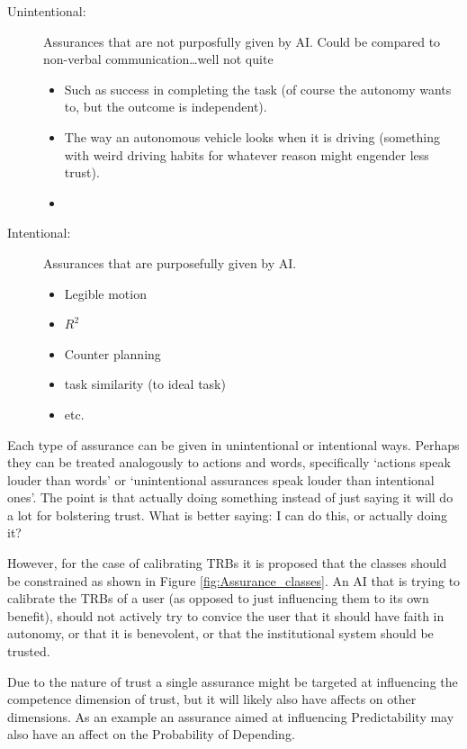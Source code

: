     \begin{description}
        \item [Unintentional:] Assurances that are not purposfully given by AI. Could be compared to non-verbal communication\ldots well not quite
        \begin{itemize}
            \item Such as success in completing the task (of course the autonomy wants to, but the outcome is independent).
            \item The way an autonomous vehicle looks when it is driving (something with weird driving habits for whatever reason might engender less trust). 
            \item 
        \end{itemize}
        \item [Intentional:] Assurances that are purposefully given by AI.
        \begin{itemize}
            \item Legible motion
            \item $R^2$
            \item Counter planning
            \item task similarity (to ideal task)
            \item etc.
        \end{itemize}
    \end{description}

    Each type of assurance can be given in unintentional or intentional ways. Perhaps they can be treated analogously to actions and words, specifically `actions speak louder than words' or `unintentional assurances speak louder than intentional ones'. The point is that actually doing something instead of just saying it will do a lot for bolstering trust. What is better saying: I can do this, or actually doing it?

    However, for the case of calibrating TRBs it is proposed that the classes should be constrained as shown in Figure \ref{fig:Assurance_classes}. An AI that is trying to calibrate the TRBs of a user (as opposed to just influencing them to its own benefit), should not actively try to convice the user that it should have faith in autonomy, or that it is benevolent, or that the institutional system should be trusted.

    Due to the nature of trust a single assurance might be targeted at influencing the competence dimension of trust, but it will likely also have affects on other dimensions. As an example an assurance aimed at influencing Predictability may also have an affect on the Probability of Depending.

